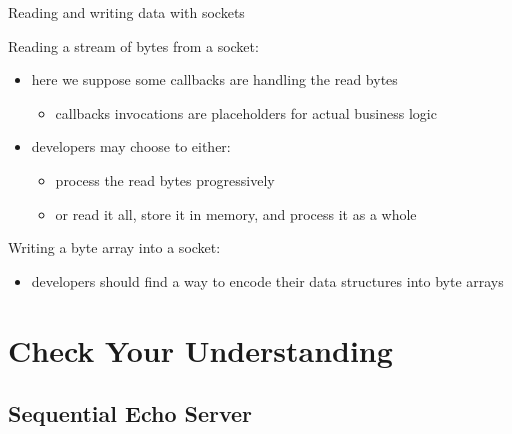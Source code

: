 \documentclass[presentation]{beamer}\mode<presentation>{\usetheme{AMSBolognaFC}}
\begin{document}
\begin{frame}[c, allowframebreaks]{Reading and writing data with sockets}

    Reading a \alert{stream of bytes} from a socket:
    
    \begin{itemize}
        \item here we suppose some callbacks are handling the read bytes
        \begin{itemize}
            \item callbacks invocations are placeholders for actual business logic
        \end{itemize}

        \item developers may choose to either:
        \begin{itemize}
            \item process the read bytes progressively
            \item or read it all, store it in memory, and process it as a whole
        \end{itemize}
    \end{itemize}

    \framebreak

    Writing a \alert{byte array} into a socket:
    
    \begin{itemize}
        \item developers should find a way to encode their data structures into byte arrays
    \end{itemize}

\end{frame}

\section{Check Your Understanding}

\subsection{Sequential Echo Server}
\end{document}
